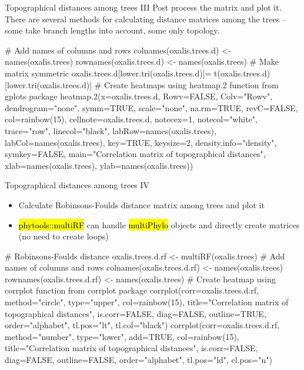 \documentclass[compress, ucs, xelatex, 11pt, xcolor=svgnames,
  hyperref={
    bookmarks=true,
    unicode=true,
    colorlinks=true,
    pdftitle={Molecular data in R},
    plainpages=false,
    pdfauthor={Vojtech Zeisek},
    pdfsubject={Course about phylogeny and evolution in R},
    pdfcreator={XeLaTeX},
    pdfkeywords={R, evolution, phylogeny, molecular data},
    linkcolor=Tomato,
    anchorcolor=SaddleBrown,
    citecolor=Goldenrod,
    filecolor=DarkMagenta,
    menucolor=Sienna,
    urlcolor=DarkTurquoise,
    pdftex},
  url={hyphens, lowtilde} %
  ]{beamer}
\renewcommand{\texttt}[1]{\hl{\ttfamily #1}}
\begin{document}
\begin{frame}[fragile]{Topographical distances among trees III}
Post process the matrix and plot it. There are several methods for calculating distance matrices among the trees -- some take branch lengths into account, some only topology.
  \begin{spluscode}
    # Add names of columns and rows
    colnames(oxalis.trees.d) <- names(oxalis.trees)
    rownames(oxalis.trees.d) <- names(oxalis.trees)
    # Make matrix symmetric
    oxalis.trees.d[lower.tri(oxalis.trees.d)]=
      t(oxalis.trees.d)[lower.tri(oxalis.trees.d)]
    # Create heatmaps using heatmap.2 function from gplots package
    heatmap.2(x=oxalis.trees.d, Rowv=FALSE, Colv="Rowv", dendrogram="none",
      symm=TRUE, scale="none", na.rm=TRUE, revC=FALSE, col=rainbow(15),
      cellnote=oxalis.trees.d, notecex=1, notecol="white", trace="row",
      linecol="black", labRow=names(oxalis.trees),
      labCol=names(oxalis.trees), key=TRUE, keysize=2,
      density.info="density", symkey=FALSE, main="Correlation matrix of
      topographical distances", xlab=names(oxalis.trees),
      ylab=names(oxalis.trees))
  \end{spluscode}
\end{frame}

\begin{frame}[fragile]{Topographical distances among trees IV}
\begin{itemize}
  \item Calculate Robinsons-Foulds distance matrix among trees and plot it
  \item \texttt{phytools::multiRF} can handle \texttt{multiPhylo} objects and directly create matrices (no need to create loops)
\end{itemize}
  \begin{spluscode}
    # Robinsons-Foulds distance
    oxalis.trees.d.rf <- multiRF(oxalis.trees)
    # Add names of columns and rows
    colnames(oxalis.trees.d.rf) <- names(oxalis.trees)
    rownames(oxalis.trees.d.rf) <- names(oxalis.trees)
    # Create heatmap using corrplot function from corrplot package
    corrplot(corr=oxalis.trees.d.rf, method="circle", type="upper",
      col=rainbow(15), title="Correlation matrix of topographical
      distances", is.corr=FALSE, diag=FALSE, outline=TRUE,
      order="alphabet", tl.pos="lt", tl.col="black")
    corrplot(corr=oxalis.trees.d.rf, method="number", type="lower",
      add=TRUE, col=rainbow(15), title="Correlation matrix of
      topographical distances", is.corr=FALSE, diag=FALSE,
      outline=FALSE, order="alphabet", tl.pos="ld", cl.pos="n")
  \end{spluscode}
\end{frame}
\end{document}
